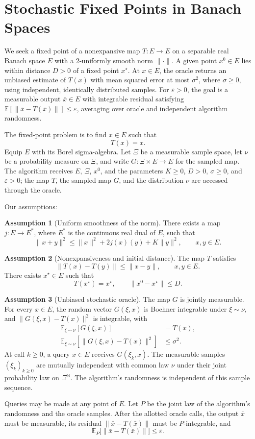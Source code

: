 \documentclass[10pt]{article}
\theoremstyle{definition}
\newtheorem{assumption}{Assumption}
\begin{document}
\section*{Stochastic Fixed Points in Banach Spaces}
We seek a fixed point of a nonexpansive map $T:E\to E$ on a separable real Banach space $E$ with a 2-uniformly smooth norm $\|\cdot\|$. A given point $x^0\in E$ lies within distance $D>0$ of a fixed point $x^\star$. At $x\in E$, the oracle returns an unbiased estimate of $T(x)$ with mean squared error at most $\sigma^2$, where $\sigma\geq0$, using independent, identically distributed samples. For $\varepsilon>0$, the goal is a measurable output $\bar{x}\in E$ with integrable residual satisfying $\mathbb{E}[\|\bar{x}-T(\bar{x})\|]\leq\varepsilon$, averaging over oracle and independent algorithm randomness.

The fixed-point problem is to find $x\in E$ such that
\[
T(x)=x.
\]
Equip $E$ with its Borel sigma-algebra. Let $\Xi$ be a measurable sample space, let $\nu$ be a probability measure on $\Xi$, and write $G:\Xi\times E\to E$ for the sampled map. The algorithm receives $E$, $\Xi$, $x^0$, and the parameters $K\geq0$, $D>0$, $\sigma\geq0$, and $\varepsilon>0$; the map $T$, the sampled map $G$, and the distribution $\nu$ are accessed through the oracle.

Our assumptions:
\begin{assumption}[Uniform smoothness of the norm]
There exists a map $j:E\to E^*$, where $E^*$ is the continuous real dual of $E$, such that
\[
\|x+y\|^2\leq\|x\|^2+2j(x)(y)+K\|y\|^2,
\qquad x,y\in E.
\]
\end{assumption}

\begin{assumption}[Nonexpansiveness and initial distance]
The map $T$ satisfies
\[
\|T(x)-T(y)\|\leq\|x-y\|,
\qquad x,y\in E.
\]
There exists $x^\star\in E$ such that
\[
T(x^\star)=x^\star,
\qquad \|x^0-x^\star\|\leq D.
\]
\end{assumption}

\begin{assumption}[Unbiased stochastic oracle]
The map $G$ is jointly measurable. For every $x\in E$, the random vector $G(\xi,x)$ is Bochner integrable under $\xi\sim\nu$, and $\|G(\xi,x)-T(x)\|^2$ is integrable, with
\[
\begin{aligned}
\mathbb{E}_{\xi\sim\nu}[G(\xi,x)]&=T(x),\\
\mathbb{E}_{\xi\sim\nu}[\|G(\xi,x)-T(x)\|^2]&\leq\sigma^2.
\end{aligned}
\]
At call $k\geq0$, a query $x\in E$ receives $G(\xi_k,x)$. The measurable samples $(\xi_k)_{k\geq0}$ are mutually independent with common law $\nu$ under their joint probability law on $\Xi^{\mathbb{N}}$. The algorithm's randomness is independent of this sample sequence.
\end{assumption}

Queries may be made at any point of $E$. Let $P$ be the joint law of the algorithm's randomness and the oracle samples. After the allotted oracle calls, the output $\bar{x}$ must be measurable, its residual $\|\bar{x}-T(\bar{x})\|$ must be $P$-integrable, and
\[
\mathbb{E}_{P}\bigl[\|\bar{x}-T(\bar{x})\|\bigr]\leq\varepsilon.
\]
\end{document}
